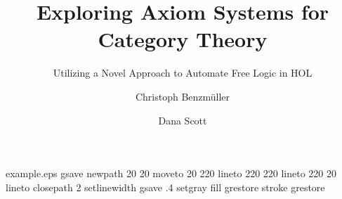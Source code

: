 %
%
%
%
%
\begin{filecontents*}{example.eps}
gsave
newpath
  20 20 moveto
  20 220 lineto
  220 220 lineto
  220 20 lineto
closepath
2 setlinewidth
gsave
  .4 setgray fill
grestore
stroke
grestore
\end{filecontents*}
%
\RequirePackage{fix-cm}
%
\documentclass[smallextended]{svjour3}       %
%
\smartqed  %
%
\usepackage{graphicx}
%
%
%
%
%


\title{Exploring Axiom Systems for Category Theory%
}
\subtitle{Utilizing a 
 Novel Approach to Automate Free Logic in HOL}


\author{Christoph Benzmüller       \and
      Dana Scott 
}



